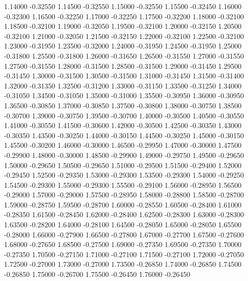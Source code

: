 {1.14000 -0.32550
1.14500 -0.32550
1.15000 -0.32550
1.15500 -0.32450
1.16000 -0.32300
1.16500 -0.32250
1.17000 -0.32250
1.17500 -0.32200
1.18000 -0.32100
1.18500 -0.32100
1.19000 -0.32050
1.19500 -0.32100
1.20000 -0.32150
1.20500 -0.32100
1.21000 -0.32050
1.21500 -0.32150
1.22000 -0.32100
1.22500 -0.32100
1.23000 -0.31950
1.23500 -0.32000
1.24000 -0.31950
1.24500 -0.31950
1.25000 -0.31800
1.25500 -0.31800
1.26000 -0.31650
1.26500 -0.31550
1.27000 -0.31550
1.27500 -0.31550
1.28000 -0.31500
1.28500 -0.31500
1.29000 -0.31450
1.29500 -0.31450
1.30000 -0.31500
1.30500 -0.31500
1.31000 -0.31450
1.31500 -0.31400
1.32000 -0.31350
1.32500 -0.31200
1.33000 -0.31150
1.33500 -0.31250
1.34000 -0.31050
1.34500 -0.31050
1.35000 -0.31000
1.35500 -0.30950
1.36000 -0.30950
1.36500 -0.30850
1.37000 -0.30850
1.37500 -0.30800
1.38000 -0.30750
1.38500 -0.30700
1.39000 -0.30750
1.39500 -0.30700
1.40000 -0.30500
1.40500 -0.30550
1.41000 -0.30550
1.41500 -0.30600
1.42000 -0.30500
1.42500 -0.30350
1.43000 -0.30350
1.43500 -0.30250
1.44000 -0.30150
1.44500 -0.30250
1.45000 -0.30150
1.45500 -0.30200
1.46000 -0.30000
1.46500 -0.29950
1.47000 -0.30000
1.47500 -0.29900
1.48000 -0.30000
1.48500 -0.29900
1.49000 -0.29750
1.49500 -0.29650
1.50000 -0.29650
1.50500 -0.29650
1.51000 -0.29500
1.51500 -0.29400
1.52000 -0.29450
1.52500 -0.29350
1.53000 -0.29300
1.53500 -0.29300
1.54000 -0.29250
1.54500 -0.29300
1.55000 -0.29300
1.55500 -0.29100
1.56000 -0.28950
1.56500 -0.29000
1.57000 -0.29000
1.57500 -0.28950
1.58000 -0.28800
1.58500 -0.28700
1.59000 -0.28750
1.59500 -0.28700
1.60000 -0.28550
1.60500 -0.28400
1.61000 -0.28350
1.61500 -0.28450
1.62000 -0.28400
1.62500 -0.28300
1.63000 -0.28300
1.63500 -0.28200
1.64000 -0.28100
1.64500 -0.28050
1.65000 -0.28050
1.65500 -0.28000
1.66000 -0.27900
1.66500 -0.27800
1.67000 -0.27700
1.67500 -0.27600
1.68000 -0.27650
1.68500 -0.27500
1.69000 -0.27350
1.69500 -0.27350
1.70000 -0.27350
1.70500 -0.27150
1.71000 -0.27100
1.71500 -0.27100
1.72000 -0.27050
1.72500 -0.27000
1.73000 -0.27000
1.73500 -0.26850
1.74000 -0.26850
1.74500 -0.26850
1.75000 -0.26700
1.75500 -0.26450
1.76000 -0.26450
}

\def\DataShapeFittedXmin{-2.40}
\def\DataShapeFittedXmax{2.40}
\def\DataShapeFittedYmin{-0.37}
\def\DataShapeFittedYmax{-0.19}
\def\DataShapeFittedDxV{0.96}
\def\DataShapeFittedDyV{0.03}
\def\DataShapeFitted{
-2.40000 -0.19595
-2.30000 -0.20945
-2.20000 -0.22237
-2.10000 -0.23471
-2.00000 -0.24648
-1.90000 -0.25767
-1.80000 -0.26828
-1.70000 -0.27833
-1.60000 -0.28779
-1.50000 -0.29668
-1.40000 -0.30500
-1.30000 -0.31274
-1.20000 -0.31990
-1.10000 -0.32649
-1.00000 -0.33251
-0.90000 -0.33795
-0.80000 -0.34281
-0.70000 -0.34710
-0.60000 -0.35081
-0.50000 -0.35395
-0.40000 -0.35651
-0.30000 -0.35850
-0.20000 -0.35991
-0.10000 -0.36074
0.00000 -0.36100
0.10000 -0.36069
0.20000 -0.35980
0.30000 -0.35833
0.40000 -0.35629
0.50000 -0.35368
0.60000 -0.35049
0.70000 -0.34672
0.80000 -0.34238
0.90000 -0.33746
1.00000 -0.33197
1.10000 -0.32590
1.20000 -0.31926
1.30000 -0.31204
1.40000 -0.30424
1.50000 -0.29587
1.60000 -0.28693
1.70000 -0.27741
1.80000 -0.26732
1.90000 -0.25664
2.00000 -0.24540
2.10000 -0.23358
2.20000 -0.22118
2.30000 -0.20821
2.40000 -0.19466
}

